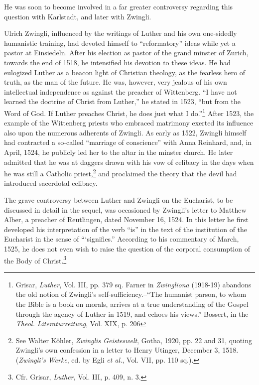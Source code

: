 He was soon to become involved in a far greater controversy regarding
this question with Karlstadt, and later with Zwingli.

Ulrich Zwingli, influenced by the writings of Luther and his own
one-sidedly humanistic training, had devoted himself to “reformatory”
ideas while yet a pastor at Einsiedeln. After his election as pastor of
the grand minster of Zurich, towards the end of 1518, he
intensified his devotion to these ideas. He had eulogized Luther as a
beacon light of Christian theology, as the fearless hero of truth, as
the man of the future. He was, however, very jealous of his own intellectual
independence as against the preacher of Wittenberg. “I
have not learned the doctrine of Christ from Luther,” he stated in
1523, “but from the Word of God. If Luther preaches Christ, he
does just what I do.”\footnote
{Grisar, \textit{Luther}, Vol. III, pp. 379 sq. Farner in \textit{Zwingliona} (1918-19) abandons the
old notion of Zwingli’s self-sufficiency.--“The humanist parson, to whom the Bible is a
book on morals, arrives at a true understanding of the Gospel through the agency of
Luther in 1519, and echoes his views.” Bossert, in the \textit{Theol. Literaturzeitung}, Vol. XIX,
p. 206}
After 1523, the example of the Wittenberg
priests who embraced matrimony exerted its influence also upon the
numerous adherents of Zwingli. As early as 1522, Zwingli himself
had contracted a so-called “marriage of conscience” with Anna
Reinhard, and, in April, 1524, he publicly led her to the altar in the
minster church. He later admitted that he was at daggers drawn with
his vow of celibacy in the days when he was still a Catholic priest,\footnote
{See Walter Köhler, \textit{Zwinglis Geisteswelt}, Gotha, 1920, pp. 22 and 31, quoting Zwingli’s
own confession in a letter to Henry Utinger, December 3, 1518. (\textit{Zwingli’s Werke}, ed. by
Egli \textit{et al.}, Vol. VII, pp. 110 sq.).}
and proclaimed the theory that the devil had introduced sacerdotal
celibacy.

The grave controversy between Luther and Zwingli on the Eucharist, to
be discussed in detail in the sequel, was occasioned by
Zwingli’s letter to Matthew Alber, a preacher of Reutlingen, dated
November 16, 1524. In this letter he first developed his interpretation
of the verb “is” in the text of the institution of the Eucharist in the
sense of “‘signifies.” According to his commentary of March, 1525,
he does not even wish to raise the question of the corporal consumption
of the Body of Christ.\footnote{Cfr. Grisar, \textit{Luther}, Vol. III, p. 409, n. 3.}

